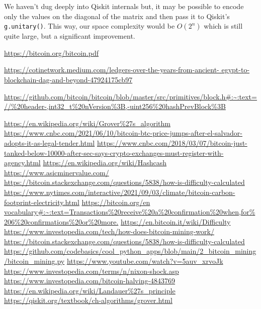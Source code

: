 \documentclass[11pt]{article} %
\begin{document}
\noindent We haven't dug deeply into Qiskit internals but, it may be possible to encode only the values on the diagonal of the matrix and then pass it to Qiskit's \lstinline{g.unitary()}. This way, our space complexity would be $O(2^n)$ which is still quite large, but a significant improvement.

\begin{thebibliography}{19}
\url{https://bitcoin.org/bitcoin.pdf}

 \url{https://cotinetwork.medium.com/ledgers-over-the-years-from-ancient-
egypt-to-blockchain-dag-and-beyond-47924175cb97}

 \url{https://github.com/bitcoin/bitcoin/blob/master/src/primitives/block.h#:~:text=//%20header-,int32_t%20nVersion%3B,-uint256%20hashPrevBlock%3B}

 \url{https://en.wikipedia.org/wiki/Grover%27s_algorithm}
  \url{https://www.cnbc.com/2021/06/10/bitcoin-btc-price-jumps-after-el-salvador-adopts-it-as-legal-tender.html}
 \url{https://www.cnbc.com/2018/03/07/bitcoin-just-tanked-below-10000-after-sec-says-crypto-exchanges-must-register-with-agency.html}
 \url{https://en.wikipedia.org/wiki/Hashcash}
 \url{https://www.asicminervalue.com/}
 \url{https://bitcoin.stackexchange.com/questions/5838/how-is-difficulty-calculated}
 \url{https://www.nytimes.com/interactive/2021/09/03/climate/bitcoin-carbon-footprint-electricity.html}
 \url{https://bitcoin.org/en vocabulary#:~:text=Transactions%20receive%20a%20confirmation%20when,for%206%20confirmations%20or%20more.}
 \url{https://en.bitcoin.it/wiki/Difficulty}
 \url{https://www.investopedia.com/tech/how-does-bitcoin-mining-work/}
 \url{https://bitcoin.stackexchange.com/questions/5838/how-is-difficulty-calculated}
 \url{https://github.com/codebasics/cool_python_apps/blob/main/2_bitcoin_mining/bitcoin_mining.py}
 \url{https://www.youtube.com/watch?v=5auv_xrvoJk}
 \url{https://www.investopedia.com/terms/n/nixon-shock.asp}
 \url{https://www.investopedia.com/bitcoin-halving-4843769}
 \url{https://en.wikipedia.org/wiki/Landauer%27s_principle}
 \url{https://qiskit.org/textbook/ch-algorithms/grover.html}
\end{thebibliography}
\end{document}
